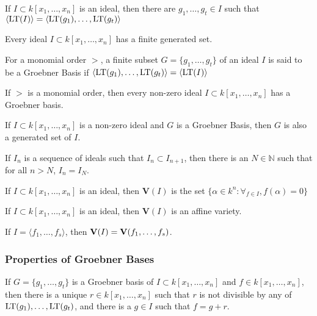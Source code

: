 \documentclass[../main.tex]{subfiles}
\begin{document}
\begin{theorem}
If $I\subset k[x_1,\hdots ,x_n]$ is an ideal, then there are $g_1,\hdots, g_t\in I$ such that $\langle \operatorname{LT}(I)\rangle = \langle \operatorname{LT}(g_1),\hdots, \operatorname{LT}(g_t)\rangle$
\end{theorem}

\begin{theorem}
Every ideal $I\subset k[x_1,\hdots ,x_n]$ has a finite generated set.
\end{theorem}

\begin{definition}
For a monomial order $>$, a finite subset $G=\{g_1,\hdots, g_t\}$ of an ideal $I$ is said to be a Groebner Basis if $\langle \operatorname{LT}(g_1),\hdots, \operatorname{LT}(g_t)\rangle = \langle \operatorname{LT}(I)\rangle$
\end{definition}

\begin{theorem}
If $>$ is a monomial order, then every non-zero ideal $I\subset k[x_1,\hdots ,x_n]$ has a Groebner basis.
\end{theorem}

\begin{theorem}
If $I\subset k[x_1,\hdots ,x_n]$ is a non-zero ideal and $G$ is a Groebner Basis, then $G$ is also a generated set of $I$.
\end{theorem}

\begin{theorem}
If $I_n$ is a sequence of ideals such that $I_{n}\subset I_{n+1}$, then there is an $N\in \mathbb{N}$ such that for all $n>N$, $I_n = I_N$.
\end{theorem}

\begin{definition}
If $I\subset k[x_1,\hdots ,x_n]$ is an ideal, then $\textbf{V}(I)$ is the set $\{\alpha \in k^n: \forall_{f\in I},f(\alpha) = 0\}$
\end{definition}

\begin{theorem}
If $I\subset k[x_1,\hdots ,x_n]$ is an ideal, then $\textbf{V}(I)$ is an affine variety.
\end{theorem}

\begin{theorem}
If $I = \langle f_1,\hdots, f_s\rangle$, then $\textbf{V}(I) = \textbf{V}(f_1,\hdots, f_s)$.
\end{theorem}
%
\subsubsection{Properties of Groebner Bases}
%
\begin{theorem}
If $G=\{g_1,\hdots, g_t\}$ is a Groebner basis of $I\subset k[x_1,\hdots ,x_n]$ and $f\in k[x_1,\hdots ,x_n]$, then there is a unique $r\in k[x_1,\hdots ,x_n]$ such that $r$ is not divisible by any of $\operatorname{LT}(g_1),\hdots, \operatorname{LT}(g_t)$, and there is a $g\in I$ such that $f = g+r$. 
\end{theorem}
\end{document}
